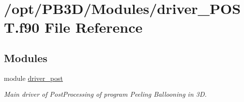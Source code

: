 \hypertarget{driver__POST_8f90}{}\section{/opt/\+P\+B3\+D/\+Modules/driver\+\_\+\+P\+O\+ST.f90 File Reference}
\label{driver__POST_8f90}
\subsection*{Modules}
\begin{DoxyCompactItemize}
\item 
module \hyperlink{namespacedriver__post}{driver\+\_\+post}
\begin{DoxyCompactList}\small\item\em Main driver of Post\+Processing of program Peeling Ballooning in 3D. \end{DoxyCompactList}\end{DoxyCompactItemize}

